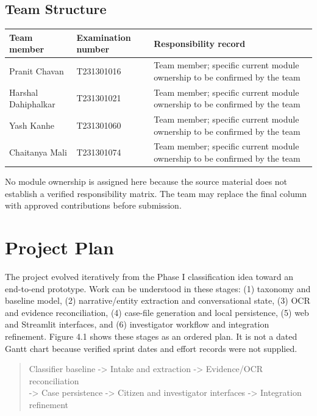 \documentclass[12pt,a4paper,oneside]{report}
\begin{document}
\subsection{Team Structure}
\begin{longtable}{|>{\RaggedRight\arraybackslash}p{}|>{\RaggedRight\arraybackslash}p{}|>{\RaggedRight\arraybackslash}p{}|}
\hline
\textbf{Team member} & \textbf{Examination number} & \textbf{Responsibility record} \\\hline
Pranit Chavan & T231301016 & Team member; specific current module ownership to be confirmed by the team \\\hline
Harshal Dahiphalkar & T231301021 & Team member; specific current module ownership to be confirmed by the team \\\hline
Yash Kanhe & T231301060 & Team member; specific current module ownership to be confirmed by the team \\\hline
Chaitanya Mali & T231301074 & Team member; specific current module ownership to be confirmed by the team \\\hline
\end{longtable}
\vspace{2mm}
No module ownership is assigned here because the source material does not establish a verified responsibility matrix. The team may replace the final column with approved contributions before submission.\par\medskip
\section{Project Plan}
The project evolved iteratively from the Phase I classification idea toward an end-to-end prototype. Work can be understood in these stages: (1) taxonomy and baseline model, (2) narrative/entity extraction and conversational state, (3) OCR and evidence reconciliation, (4) case-file generation and local persistence, (5) web and Streamlit interfaces, and (6) investigator workflow and integration refinement. Figure 4.1 shows these stages as an ordered plan. It is not a dated Gantt chart because verified sprint dates and effort records were not supplied.\par\medskip
{}
\begin{quote}\ttfamily\footnotesize Classifier baseline -> Intake and extraction -> Evidence/OCR reconciliation\\          -> Case persistence -> Citizen and investigator interfaces -> Integration refinement\end{quote}
\end{document}
